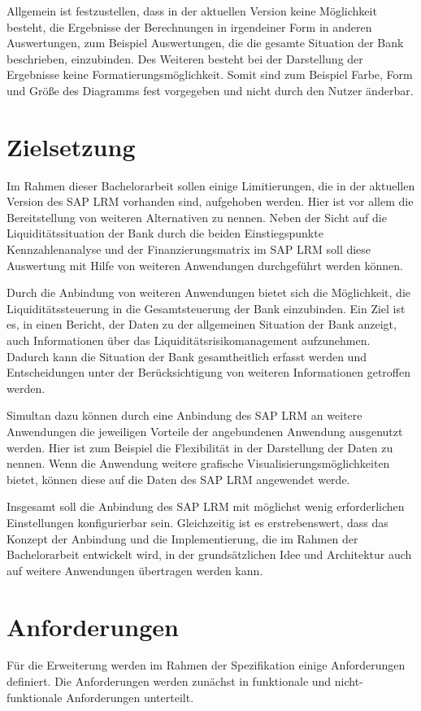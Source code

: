 \begin{onehalfspacing}
Allgemein ist festzustellen, dass in der aktuellen Version keine Möglichkeit besteht, die Ergebnisse der Berechnungen in irgendeiner Form in anderen Auswertungen, zum Beispiel Auswertungen, die die gesamte Situation der Bank beschrieben, einzubinden. Des Weiteren besteht bei der Darstellung der Ergebnisse keine Formatierungsmöglichkeit. Somit sind zum Beispiel Farbe, Form und Größe des Diagramms fest vorgegeben und nicht durch den Nutzer änderbar.

\section{Zielsetzung}
\label{sec:zielsetzung}

Im Rahmen dieser Bachelorarbeit sollen einige Limitierungen, die in der aktuellen Version des SAP LRM vorhanden sind, aufgehoben werden. Hier ist vor allem die Bereitstellung von weiteren Alternativen zu nennen. Neben der Sicht auf die Liquiditätssituation der Bank durch die beiden Einstiegspunkte Kennzahlenanalyse und der Finanzierungsmatrix im SAP LRM soll diese Auswertung mit Hilfe von weiteren Anwendungen durchgeführt werden können.

Durch die Anbindung von weiteren Anwendungen bietet sich die Möglichkeit, die  Liquiditätssteuerung in die Gesamtsteuerung der Bank einzubinden. Ein Ziel ist es, in einen Bericht, der Daten zu der allgemeinen Situation der Bank anzeigt, auch Informationen über das Liquiditätsrisikomanagement aufzunehmen. Dadurch kann die Situation der Bank gesamtheitlich erfasst werden und Entscheidungen unter der Berücksichtigung von weiteren Informationen getroffen werden.

Simultan dazu können durch eine Anbindung des SAP LRM an weitere Anwendungen die jeweiligen Vorteile der angebundenen Anwendung ausgenutzt werden. Hier ist zum Beispiel die Flexibilität in der Darstellung der Daten zu nennen. Wenn die Anwendung weitere grafische Visualisierungsmöglichkeiten bietet, können diese auf die Daten des SAP LRM angewendet werde.

Insgesamt soll die Anbindung des SAP LRM mit möglichst wenig erforderlichen Einstellungen konfigurierbar sein. Gleichzeitig ist es erstrebenswert, dass das Konzept der Anbindung und die Implementierung, die im Rahmen der Bachelorarbeit entwickelt wird, in der grundsätzlichen Idee und Architektur auch auf weitere Anwendungen übertragen werden kann.

\section{Anforderungen}
\label{sec:anforderungen}
Für die Erweiterung werden im Rahmen der Spezifikation einige Anforderungen definiert. Die Anforderungen werden zunächst in funktionale und nicht-funktionale Anforderungen unterteilt. 


\end{onehalfspacing}
